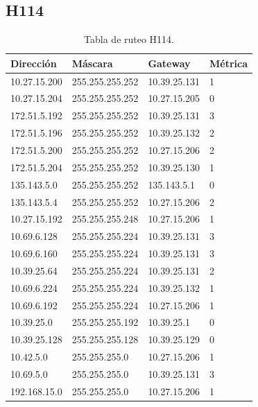 \documentclass[12pt,titlepage]{article}
\begin{document}
\subsection{H114}
\begin{table}
  \begin{center}
    \begin{tabular}{|l|l|l|l|}
      \hline
        \bf{Direcci\'on} & \bf{M\'ascara} & \bf{Gateway} & \bf{M\'etrica} \\
      \hline 
	10.27.15.200  & 255.255.255.252 & 10.39.25.131 & 1 \\
        10.27.15.204  & 255.255.255.252 & 10.27.15.205 & 0 \\
        172.51.5.192  & 255.255.255.252 & 10.39.25.131 & 3 \\
        172.51.5.196  & 255.255.255.252 & 10.39.25.132 & 2 \\
        172.51.5.200  & 255.255.255.252 & 10.27.15.206 & 2 \\
        172.51.5.204  & 255.255.255.252 & 10.39.25.130 & 1 \\
        135.143.5.0   & 255.255.255.252 & 135.143.5.1 & 0 \\
        135.143.5.4   & 255.255.255.252 & 10.27.15.206 & 2 \\ 	
	10.27.15.192  & 255.255.255.248 & 10.27.15.206 & 1 \\
	10.69.6.128   & 255.255.255.224 & 10.39.25.131 & 3 \\
        10.69.6.160   & 255.255.255.224 & 10.39.25.131 & 3 \\
	10.39.25.64   & 255.255.255.224 & 10.39.25.131 & 2 \\       
	10.69.6.224   & 255.255.255.224 & 10.39.25.132 & 1 \\
	10.69.6.192   & 255.255.255.224 & 10.27.15.206 & 1 \\	
	10.39.25.0    & 255.255.255.192 & 10.39.25.1 & 0 \\
	10.39.25.128  & 255.255.255.128 & 10.39.25.129 & 0 \\
	10.42.5.0     & 255.255.255.0 & 10.27.15.206 & 1 \\
        10.69.5.0     & 255.255.255.0 & 10.39.25.131 & 3 \\
        192.168.15.0  & 255.255.255.0 & 10.27.15.206 & 1 \\  
    \hline
    \end{tabular} \\
  \end{center}
  \caption{Tabla de ruteo H114.}
\end{table}
\FloatBarrier
\end{document}

